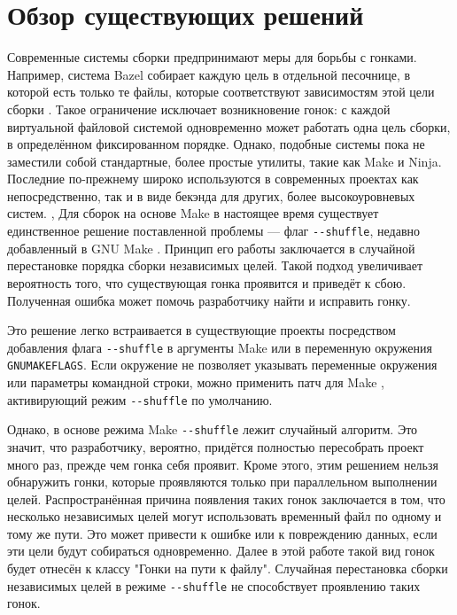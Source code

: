 \section{Обзор существующих решений}
\label{sec:Chapter2} 


Современные системы сборки предпринимают меры для борьбы с гонками. Например, система Bazel собирает каждую цель в отдельной песочнице, в которой есть только те файлы, которые соответствуют зависимостям этой цели сборки \cite{bazel-sandbox}. Такое ограничение исключает возникновение гонок: с каждой виртуальной файловой системой одновременно может работать одна цель сборки, в определённом фиксированном порядке. Однако, подобные системы пока не заместили собой стандартные, более простые утилиты, такие как Make и Ninja. Последние по-прежнему широко используются в современных проектах как непосредственно, так и в виде бекэнда для других, более высокоуровневых систем.
,
Для сборок на основе Make в настоящее время существует единственное решение поставленной проблемы --- флаг \texttt{{-}{-}shuffle}, недавно добавленный в GNU Make \cite{trofi-make-shuffle}. Принцип его работы заключается в случайной перестановке порядка сборки независимых целей. Такой подход увеличивает вероятность того, что существующая гонка проявится и приведёт к сбою. Полученная ошибка может помочь разработчику найти и исправить гонку.

Это решение легко встраивается в существующие проекты посредством добавления флага \texttt{{-}{-}shuffle} в аргументы Make или в переменную окружения \texttt{GNUMAKEFLAGS}. Если окружение не позволяет указывать переменные окружения или параметры командной строки, можно применить патч для Make \cite{make-shuffle-patch}, активирующий режим \texttt{{-}{-}shuffle} по умолчанию.

Однако, в основе режима Make \texttt{{-}{-}shuffle} лежит случайный алгоритм. Это значит, что разработчику, вероятно, придётся полностью пересобрать проект много раз, прежде чем гонка себя проявит. Кроме этого, этим решением нельзя обнаружить гонки, которые проявляются только при параллельном выполнении целей. Распространённая причина появления таких гонок заключается в том, что несколько независимых целей могут использовать временный файл по одному и тому же пути. Это может привести к ошибке или к повреждению данных, если эти цели будут собираться одновременно. Далее в этой работе такой вид гонок будет отнесён к классу "Гонки на пути к файлу". Случайная перестановка сборки независимых целей в режиме \texttt{{-}{-}shuffle} не способствует проявлению таких гонок.